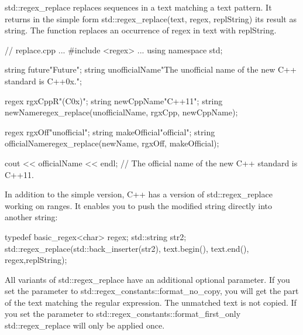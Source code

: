 
std::regex\_replace replaces sequences in a text matching a text pattern. It returns in the simple form std::regex\_replace(text, regex, replString) its result as string. The function replaces an occurrence of regex in text with replString.


\begin{cpp}
// replace.cpp
...
#include <regex>
...
using namespace std;

string future{"Future"};
string unofficialName{"The unofficial name of the new C++ standard is C++0x."};

regex rgxCpp{R"(C\+\+0x)"};
string newCppName{"C++11"};
string newName{regex_replace(unofficialName, rgxCpp, newCppName)};

regex rgxOff{"unofficial"};
string makeOfficial{"official"};
string officialName{regex_replace(newName, rgxOff, makeOfficial)};

cout << officialName << endl;
							// The official name of the new C++ standard is C++11.
\end{cpp}

In addition to the simple version, C++ has a version of std::regex\_replace working on ranges. It enables you to push the modified string directly into another string:

\begin{cpp}
typedef basic_regex<char> regex;
std::string str2;
std::regex_replace(std::back_inserter(str2),
				   text.begin(), text.end(), regex,replString);
\end{cpp}

All variants of std::regex\_replace have an additional optional parameter. If you set the parameter to std::regex\_constants::format\_no\_copy, you will get the part of the text matching the regular expression. The unmatched text is not copied. If you set the parameter to std::regex\_constants::format\_first\_only std::regex\_replace will only be applied once.



































